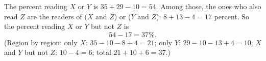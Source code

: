 The percent reading $X$ or $Y$ is $35+29-10=54$. Among those, the ones who also read $Z$ are the readers of ($X$ and $Z$) or ($Y$ and $Z$): $8+13-4=17$ percent. So the percent reading $X$ or $Y$ but not $Z$ is
\[
54-17=\boxed{37\%}.
\]
(Region by region: only $X$: $35-10-8+4=21$; only $Y$: $29-10-13+4=10$; $X$ and $Y$ but not $Z$: $10-4=6$; total $21+10+6=37$.)
